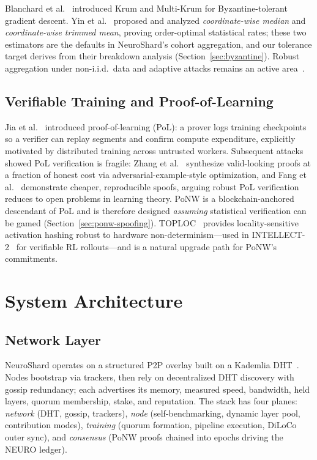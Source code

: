 \documentclass[conference]{IEEEtran}
\begin{document}
Blanchard et al.~\cite{blanchard2017machine} introduced Krum and Multi-Krum for Byzantine-tolerant gradient descent. Yin et al.~\cite{yin2018byzantine} proposed and analyzed \emph{coordinate-wise median} and \emph{coordinate-wise trimmed mean}, proving order-optimal statistical rates; these two estimators are the defaults in NeuroShard's cohort aggregation, and our tolerance target derives from their breakdown analysis (Section~\ref{sec:byzantine}). Robust aggregation under non-i.i.d.\ data and adaptive attacks remains an active area~\cite{kairouz2021advances}.

\subsection{Verifiable Training and Proof-of-Learning}

Jia et al.~\cite{jia2021proof} introduced proof-of-learning (PoL): a prover logs training checkpoints so a verifier can replay segments and confirm compute expenditure, explicitly motivated by distributed training across untrusted workers. Subsequent attacks showed PoL verification is fragile: Zhang et al.~\cite{zhang2022adversarial} synthesize valid-looking proofs at a fraction of honest cost via adversarial-example-style optimization, and Fang et al.~\cite{fang2023proof} demonstrate cheaper, reproducible spoofs, arguing robust PoL verification reduces to open problems in learning theory. PoNW is a blockchain-anchored descendant of PoL and is therefore designed \emph{assuming} statistical verification can be gamed (Section~\ref{sec:ponw-spoofing}). TOPLOC~\cite{ong2025toploc} provides locality-sensitive activation hashing robust to hardware non-determinism---used in INTELLECT-2~\cite{primeintellect2025intellect2} for verifiable RL rollouts---and is a natural upgrade path for PoNW's commitments.

\section{System Architecture}
\label{sec:architecture}

\subsection{Network Layer}

NeuroShard operates on a structured P2P overlay built on a Kademlia DHT~\cite{maymounkov2002kademlia}. Nodes bootstrap via trackers, then rely on decentralized DHT discovery with gossip redundancy; each advertises its memory, measured speed, bandwidth, held layers, quorum membership, stake, and reputation. The stack has four planes: \emph{network} (DHT, gossip, trackers), \emph{node} (self-benchmarking, dynamic layer pool, contribution modes), \emph{training} (quorum formation, pipeline execution, DiLoCo outer sync), and \emph{consensus} (PoNW proofs chained into epochs driving the NEURO ledger).
\end{document}
